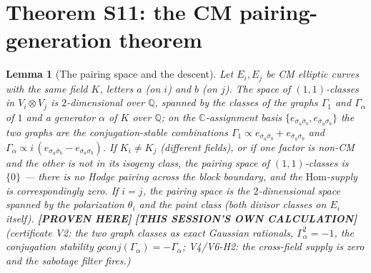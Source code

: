 \documentclass[11pt]{article}
\newtheorem{lemma}[theorem]{Lemma}
\newcommand{\PROVEN}{\textbf{[PROVEN HERE]}}
\newcommand{\MINE}{\textbf{[THIS SESSION'S OWN CALCULATION]}}
\newcommand{\Q}{\mathbb{Q}}
\newcommand{\C}{\mathbb{C}}
\newcommand{\Hom}{\mathrm{Hom}}
\begin{document}
\section{Theorem S11: the CM pairing-generation theorem}

\begin{lemma}[The pairing space and the descent]\label{lem:pairing}
Let $E_i,E_j$ be CM elliptic curves with the same field $K$, letters
$a$ (on $i$) and $b$ (on $j$). The space of $(1,1)$-classes in
$V_i\otimes V_j$ is $2$-dimensional over $\Q$, spanned by the classes of
the graphs $\Gamma_1$ and $\Gamma_\alpha$ of $1$ and a generator
$\alpha$ of $K$ over $\Q$; on the $\C$-assignment basis
$\{e_{\sigma_a\bar\sigma_b},e_{\bar\sigma_a\sigma_b}\}$ the two graphs are
the conjugation-stable combinations
$\Gamma_1\propto e_{\sigma_a\bar\sigma_b}+e_{\bar\sigma_a\sigma_b}$ and
$\Gamma_\alpha\propto i\,(e_{\sigma_a\bar\sigma_b}-e_{\bar\sigma_a\sigma_b})$.
If $K_i\neq K_j$ (different fields), or if one factor is non-CM and the
other is not in its isogeny class, the pairing space of $(1,1)$-classes
is $\{0\}$ --- there is no Hodge pairing across the block boundary, and
the $\Hom$-supply is correspondingly zero. If $i=j$, the pairing space
is the $2$-dimensional space spanned by the polarization $\theta_i$ and
the point class (both divisor classes on $E_i$ itself).
\PROVEN{} \MINE{} (certificate V2: the two graph classes as exact
Gaussian rationals, $\Gamma_\alpha^2=-1$, the conjugation stability
$gconj(\Gamma_\alpha)=-\Gamma_\alpha$; V4/V6-H2: the cross-field supply
is zero and the sabotage filter fires.)
\end{lemma}
\end{document}
